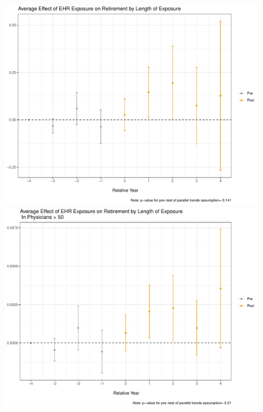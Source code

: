 \documentclass[11pt]{article}
\begin{document}
\begin{figure}[ht]
\caption{}
        \begin{minipage}[b]{0.47\linewidth}
            \centering
            \includegraphics[width=\textwidth]{Objects/ggdid_retire_allEHR.pdf}
        \end{minipage}
        \hspace{0.2cm}
        \begin{minipage}[b]{0.47\linewidth}
            \centering
            \includegraphics[width=\textwidth]{Objects/ggdid_retire_allEHR_old.pdf}
        \end{minipage}
        \label{fig:retirefirst}
\end{figure}
\end{document}

